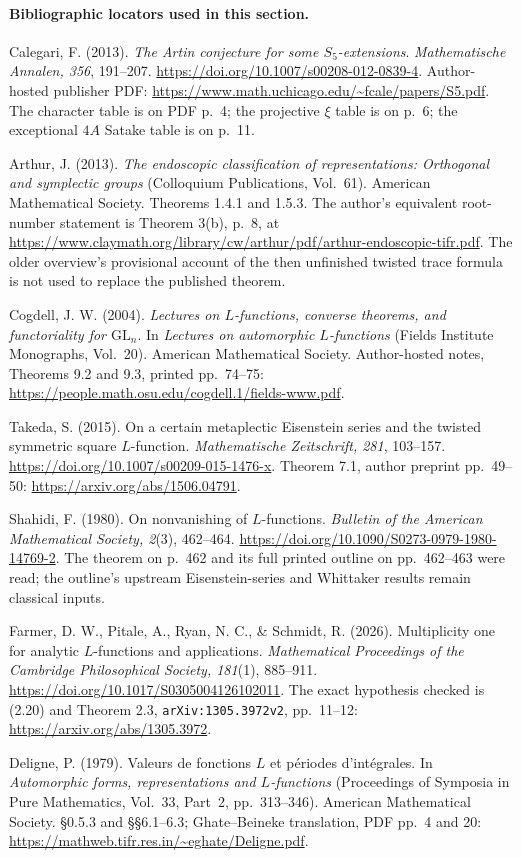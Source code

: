 \paragraph{Bibliographic locators used in this section.}
Calegari, F. (2013). \emph{The Artin conjecture for some
$S_5$-extensions}. \emph{Mathematische Annalen, 356}, 191--207.
\url{https://doi.org/10.1007/s00208-012-0839-4}.
Author-hosted publisher PDF:
\url{https://www.math.uchicago.edu/~fcale/papers/S5.pdf}.
The character table is on PDF p.~4; the projective $\xi$ table
is on p.~6; the exceptional $4A$ Satake table is on p.~11.

Arthur, J. (2013). \emph{The endoscopic classification of
representations: Orthogonal and symplectic groups} (Colloquium
Publications, Vol.~61). American Mathematical Society.
Theorems 1.4.1 and 1.5.3. The author's equivalent root-number
statement is Theorem 3(b), p.~8, at
\url{https://www.claymath.org/library/cw/arthur/pdf/arthur-endoscopic-tifr.pdf}.
The older overview's provisional account of the then unfinished
twisted trace formula is not used to replace the published theorem.

Cogdell, J. W. (2004). \emph{Lectures on $L$-functions, converse
theorems, and functoriality for $\mathrm{GL}_n$}. In
\emph{Lectures on automorphic $L$-functions} (Fields Institute
Monographs, Vol.~20). American Mathematical Society.
Author-hosted notes, Theorems 9.2 and 9.3, printed pp.~74--75:
\url{https://people.math.osu.edu/cogdell.1/fields-www.pdf}.

Takeda, S. (2015). On a certain metaplectic Eisenstein series and
the twisted symmetric square $L$-function.
\emph{Mathematische Zeitschrift, 281}, 103--157.
\url{https://doi.org/10.1007/s00209-015-1476-x}.
Theorem 7.1, author preprint pp.~49--50:
\url{https://arxiv.org/abs/1506.04791}.

Shahidi, F. (1980). On nonvanishing of $L$-functions.
\emph{Bulletin of the American Mathematical Society, 2}(3),
462--464. \url{https://doi.org/10.1090/S0273-0979-1980-14769-2}.
The theorem on p.~462 and its full printed outline on
pp.~462--463 were read; the outline's upstream Eisenstein-series
and Whittaker results remain classical inputs.

Farmer, D. W., Pitale, A., Ryan, N. C., \& Schmidt, R. (2026).
Multiplicity one for analytic $L$-functions and applications.
\emph{Mathematical Proceedings of the Cambridge Philosophical
Society, 181}(1), 885--911.
\url{https://doi.org/10.1017/S0305004126102011}.
The exact hypothesis checked is (2.20) and Theorem 2.3,
\texttt{arXiv:1305.3972v2}, pp.~11--12:
\url{https://arxiv.org/abs/1305.3972}.

Deligne, P. (1979). Valeurs de fonctions $L$ et p\'eriodes
d'int\'egrales. In \emph{Automorphic forms, representations and
$L$-functions} (Proceedings of Symposia in Pure Mathematics,
Vol.~33, Part~2, pp.~313--346). American Mathematical Society.
\S0.5.3 and \S\S6.1--6.3; Ghate--Beineke translation, PDF
pp.~4 and 20:
\url{https://mathweb.tifr.res.in/~eghate/Deligne.pdf}.
